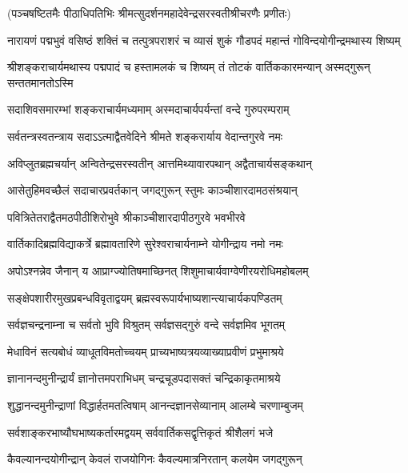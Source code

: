 
(पञ्चषष्टितमैः पीठाधिपतिभिः श्रीमत्सुदर्शनमहादेवेन्द्रसरस्वतीश्रीचरणैः प्रणीतः)

\fourlineindentedshloka
{नारायणं पद्मभुवं वसिष्ठं}
{शक्तिं च तत्पुत्रपराशरं च} 
{व्यासं शुकं गौडपदं महान्तं}
{गोविन्दयोगीन्द्रमथास्य शिष्यम्}%

\twolineshloka
{श्रीशङ्कराचार्यमथास्य पद्मपादं च हस्तामलकं च शिष्यम्} 
{तं तोटकं वार्तिककारमन्यान् अस्मद्गुरून् सन्ततमानतोऽस्मि}%

\twolineshloka
{सदाशिवसमारम्भां शङ्कराचार्यमध्यमाम्} 
{अस्मदाचार्यपर्यन्तां वन्दे गुरुपरम्पराम्}%

\twolineshloka
{सर्वतन्त्रस्वतन्त्राय सदाऽऽत्माद्वैतवेदिने} 
{श्रीमते शङ्करार्याय वेदान्तगुरवे नमः}%

\twolineshloka
{अविप्लुतब्रह्मचर्यान् अन्वितेन्द्रसरस्वतीन्} 
{आत्तमिथ्यावारपथान् अद्वैताचार्यसङ्कथान्}%

\twolineshloka
{आसेतुहिमवच्छैलं सदाचारप्रवर्तकान्} 
{जगद्गुरून् स्तुमः काञ्चीशारदामठसंश्रयान्}%

\twolineshloka
{पवित्रितेतराद्वैतमठपीठीशिरोभुवे} 
{श्रीकाञ्चीशारदापीठगुरवे भवभीरवे}%

\twolineshloka
{वार्तिकादिब्रह्मविद्याकर्त्रे ब्रह्मावतारिणे} 
{सुरेश्वराचार्यनाम्ने योगीन्द्राय नमो नमः}%

\twolineshloka
{अपोऽश्नन्नेव जैनान् य आप्राग्ज्योतिषमाच्छिनत्} 
{शिशुमाचार्यवाग्वेणीरयरोधिमहोबलम्}%

\twolineshloka
{सङ्क्षेपशारीरमुखप्रबन्धविवृताद्वयम्} 
{ब्रह्मस्वरूपार्यभाष्यशान्त्याचार्यकपण्डितम्}%

\twolineshloka
{सर्वज्ञचन्द्रनाम्ना च सर्वतो भुवि विश्रुतम्} 
{सर्वज्ञसद्गुरुं वन्दे सर्वज्ञमिव भूगतम्}%

\twolineshloka
{मेधाविनं सत्यबोधं व्याधूतविमतोच्चयम्} 
{प्राच्यभाष्यत्रयव्याख्याप्रवीणं प्रभुमाश्रये}%

\twolineshloka
{ज्ञानानन्दमुनीन्द्रार्यं ज्ञानोत्तमपराभिधम्} 
{चन्द्रचूडपदासक्तं चन्द्रिकाकृतमाश्रये}%

\twolineshloka
{शुद्धानन्दमुनीन्द्राणां विद्धार्हतमतत्विषाम्} 
{आनन्दज्ञानसेव्यानाम् आलम्बे चरणाम्बुजम्}%

\twolineshloka
{सर्वशाङ्करभाष्यौघभाष्यकर्तारमद्वयम्} 
{सर्ववार्तिकसद्वृत्तिकृतं श्रीशैलगं भजे}%

\twolineshloka
{कैवल्यानन्दयोगीन्द्रान् केवलं राजयोगिनः} 
{कैवल्यमात्रनिरतान् कलयेम जगद्गुरून्}%

